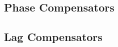 \documentclass[12pt,letter]{article}
\begin{document}
\subsection{Phase Compensators}


\subsection{Lag Compensators}
















	\pagebreak
	\renewcommand{\thepage}{}
	\renewcommand\refname{References Cited}
	\pagestyle{plain}
	
	
\end{document}
